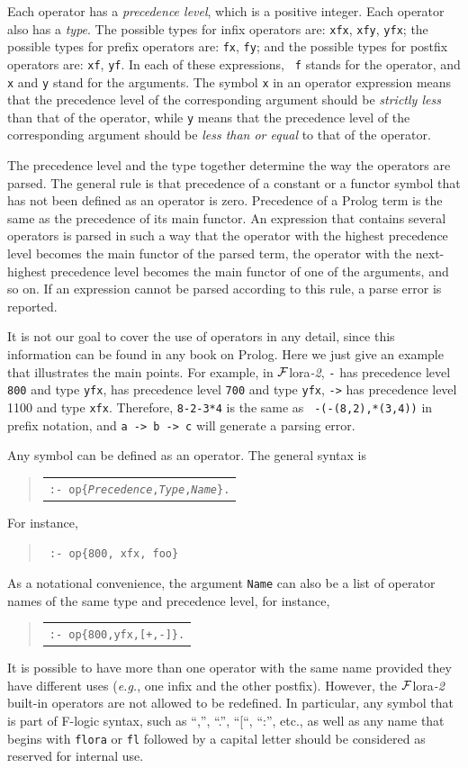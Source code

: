 \documentclass[11pt]{article}
\newcommand{\FLSYSTEM}{{\mbox{\sc ${\cal F}${lora}\rm\emph{-2}}}\xspace}
\newenvironment{qrules}{\begin{quote}\tt\begin{tabular}[t]{l}}%
{\end{tabular}\end{quote}}
\newcommand{\fl}{\mbox{F-logic}\xspace}
\begin{document}
%
Each operator has a \emph{precedence level}, which is a positive integer.
Each operator also has a \emph{type}. The possible types for infix operators
are: {\tt xfx}, {\tt xfy}, {\tt yfx}; the possible types for prefix
operators are: {\tt fx}, {\tt fy}; and the possible types for postfix
operators are: {\tt xf}, {\tt yf}. In each of these expressions, {\tt
  f} stands for the operator, and {\tt x} and {\tt y} stand for the
arguments.  The symbol {\tt x} in an operator expression means that the
precedence level of the corresponding argument should be \emph{strictly
  less} than that of the operator, while {\tt y} means that the precedence
level of the corresponding argument should be \emph{less than or equal} to
that of the operator.

The precedence level and the type together determine the way the operators
are parsed. The general rule is that precedence of a constant or a functor
symbol that has not been defined as an operator is zero. Precedence of a
Prolog term is the same as the precedence of its main functor. 
An expression that contains several operators is parsed in such a way that
the operator with the highest precedence level becomes the main functor of
the parsed term, the operator with the next-highest precedence
level becomes the main functor of one of the arguments, and so on.
If an expression cannot be parsed according to this rule, a parse error is
reported.

It is not our goal to cover the use of operators in any detail, since this
information can be found in any book on Prolog. Here we just give an
example that illustrates the main points.  For example, in \FLSYSTEM, {\tt -}
has precedence level {\tt 800} and type {\tt yfx}, {\tt *} has precedence
level {\tt 700} and type {\tt yfx}, {\tt ->} has precedence level 1100 and
type {\tt xfx}.  Therefore, {\tt 8-2-3*4} is the same as {\tt
  -(-(8,2),*(3,4))} in prefix notation, and {\tt a -> b -> c} will generate
a parsing error.


%
Any symbol can be defined as an operator. The general syntax is
\begin{qrules}
{\tt :- op\{\emph{Precedence},\emph{Type},\emph{Name}\}.}
\end{qrules}
For instance, 
\begin{quote}
 {\tt
   :- op\{800, xfx, foo\}
   }
\end{quote}
As a notational convenience, the argument {\tt Name} can also be a list of
operator names of the same type and precedence level, for instance,
\begin{qrules}
{\tt :- op\{800,yfx,[+,-]\}.}
\end{qrules}
It is possible to have more than one operator with the same name provided
they have different uses ({\it e.g.}, one infix and the other postfix).
However, the \FLSYSTEM built-in operators are not allowed to be redefined.
In particular, any symbol that is part of \fl syntax, such as ``,'', ``.'',
``[``, ``:'', etc., as well as any name that begins with {\tt flora} or
{\tt fl} followed by a capital letter should be considered as reserved for
internal use.
\end{document}
